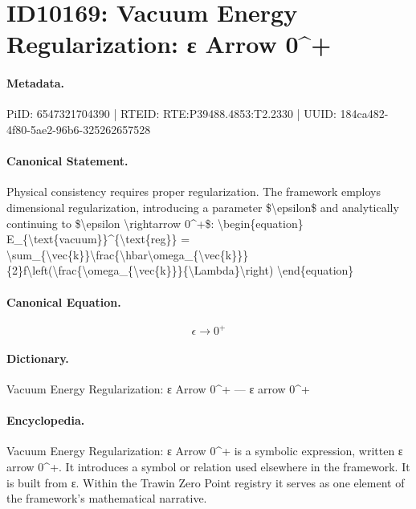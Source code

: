 \section*{ID10169: Vacuum Energy Regularization: ε Arrow 0\textasciicircum{}+}
\paragraph{Metadata.}
PiID: 6547321704390 | RTEID: RTE:P39488.4853:T2.2330 | UUID: 184ca482-4f80-5ae2-96b6-325262657528

\paragraph{Canonical Statement.}
Physical consistency requires proper regularization. The framework employs dimensional regularization, introducing a parameter \$\textbackslash{}epsilon\$ and analytically continuing to \$\textbackslash{}epsilon \textbackslash{}rightarrow 0\textasciicircum{}+\$: \textbackslash{}begin\{equation\} E\_\{\textbackslash{}text\{vacuum\}\}\textasciicircum{}\{\textbackslash{}text\{reg\}\} = \textbackslash{}sum\_\{\textbackslash{}vec\{k\}\}\textbackslash{}frac\{\textbackslash{}hbar\textbackslash{}omega\_\{\textbackslash{}vec\{k\}\}\}\{2\}f\textbackslash{}left(\textbackslash{}frac\{\textbackslash{}omega\_\{\textbackslash{}vec\{k\}\}\}\{\textbackslash{}Lambda\}\textbackslash{}right) \textbackslash{}end\{equation\}

\paragraph{Canonical Equation.}
\[
\epsilon \rightarrow 0^+
\]

\paragraph{Dictionary.}
Vacuum Energy Regularization: ε Arrow 0\textasciicircum{}+ — ε arrow 0\textasciicircum{}+

\paragraph{Encyclopedia.}
Vacuum Energy Regularization: ε Arrow 0\textasciicircum{}+ is a symbolic expression, written ε arrow 0\textasciicircum{}+. It introduces a symbol or relation used elsewhere in the framework. It is built from ε. Within the Trawin Zero Point registry it serves as one element of the framework's mathematical narrative.
